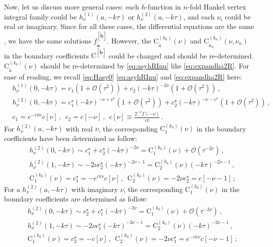 \documentclass[a4paper,11pt]{article}
\newcommand{\nn}{\nonumber}
\begin{document}
Now, let us discuss more general cases: each $h$-function in $n$-fold Hankel vertex integral family could  be  $h^{(1)}_\nu(a,-k\tau)$ or $h^{(2)}_\nu(a,-k\tau)$, and each $\nu_i$ could be real or  imaginary.
Since for all these cases, the differential equations are the same \cite{Chen:2023iix}, we have the same solutions $f_{\tilde{\bm{a}}}^{[\tilde{\bm{b}}]}$. However, the  $\text{C}_{\tilde{a}}^{(k_0)}(\nu)$ and $\text{C}_{\tilde{a}_n}^{(k_n)}(\nu,\nu_n)$ in the boundary coefficients $\text{C}^{[\tilde{\bm{b}}]}$ could be changed and should be re-determined. $\text{C}_{\tilde{a}}^{(k_0)}(\nu)$ should be re-determined by \eqref{eq:asyhRInu} like \eqref{eq:expandha2R}. For ease of reading, we  recall \eqref{eq:Hasy0} \eqref{eq:asyhRInu} and  \eqref{eq:expandha2R} here:
\begin{align}
&h_\nu^{(1)}(0,-k\tau)=c_1 (1+\mathcal{O}(\tau^2)) +  c_2 (-k\tau)^{-2\nu} (1+\mathcal{O}(\tau^2)) \, , \nn\\
&h_\nu^{(2)}(0,-k\tau)=c_1^{\star} (-k\tau)^{-\nu+\nu^\star}(1+\mathcal{O}(\tau^2)) +  c_2^{\star} (-k\tau)^{-\nu-\nu^\star} (1+\mathcal{O}(\tau^2)) \, ,\nn\\
&c_1=e^{-i\pi\nu}c[\nu]\,, ~~ c_2=c[-\nu]\,, ~~
c[\nu]\equiv \frac{ 2^{-\nu } \Gamma (-\nu )}{i \pi } \,.
\end{align}
For  $h^{(2)}_\nu(a,-k\tau)$ with real $\nu$, the corresponding $\text{C}_1^{(k_0)}(\nu)$ in the boundary coefficients have been determined as follow:
\begin{align}
&h_{\nu}^{(2)}(0,-k\tau)\sim c_1^\star +  c_2^\star (-k\tau)^{-2\nu}  = \text{C}_1^{(k_0)}(\nu)  +  \mathcal{O}(\tau^{-2\nu})   \, , \nn\\
&h_{\nu}^{(2)}(1,-k\tau)\sim-2\nu c_2^\star (-k\tau)^{-2\nu-1}=\text{C}_2^{(k_0)}(\nu) (-k\tau)^{-2\nu-1}\, ,\nn\\
&\text{C}_1^{(k_0)}(\nu) = c_1^\star=-e^{i\pi\nu}c[\nu] \, , ~~\text{C}_2^{(k_0)}(\nu) = -2\nu c_2^\star=c[-\nu-1] \, ;  \label{eq:expandha2Iagain}
\end{align}
For a $h^{(2)}_{\nu}(a,-k\tau)$ with  imaginary  $\nu$, the corresponding $\text{C}_1^{(k_0)}(\nu)$ in the boundary coefficients are determined as follow:
\begin{align}
&h_{\nu}^{(2)}(0,-k\tau)\sim c_2^\star +  c_1^\star (-k\tau)^{-2\nu}  = \text{C}_1^{(k_0)}(\nu)  +  \mathcal{O}(\tau^{-2\nu})   \, , \nn\\
&h_{\nu}^{(2)}(1,-k\tau)\sim-2\nu c_1^\star (-k\tau)^{-2\nu-1}=\text{C}_2^{(k_0)}(\nu) (-k\tau)^{-2\nu-1}\, ,\nn\\
&\text{C}_1^{(k_0)}(\nu) = c_2^\star=-c[\nu] \, , ~~\text{C}_2^{(k_0)}(\nu) = -2\nu c_1^\star=e^{-i\pi \nu}c[-\nu-1] \, ; \label{eq:expandha2I}
\end{align}
\end{document}
